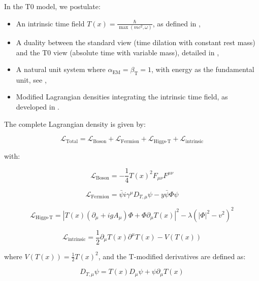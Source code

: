 \documentclass[12pt,a4paper]{article}
\newcommand{\Tfield}{T(x)}
\newcommand{\alphaEM}{\alpha_{\text{EM}}}
\newcommand{\betaT}{\beta_{\text{T}}}
\newcommand{\DhiggsT}{\Tfield (\partial_\mu + ig A_\mu) \Phi + \Phi \partial_\mu \Tfield}
\newcommand{\DTmu}{D_{T,\mu}}
\newcommand{\calL}{\mathcal{L}}
\begin{document}
	In the T0 model, we postulate:
	\begin{itemize}
		\item An intrinsic time field $\Tfield = \frac{\hbar}{\max(mc^2, \omega)}$, as defined in \cite{pascher_zeit_2025_en},
		\item A duality between the standard view (time dilation with constant rest mass) and the T0 view (absolute time with variable mass), detailed in \cite{pascher_dualismus_2025_en},
		\item A natural unit system where $\alphaEM = \betaT = 1$, with energy as the fundamental unit, see \cite{pascher_alpha_2025_en},
		\item Modified Lagrangian densities integrating the intrinsic time field, as developed in \cite{pascher_lagrange_2025_en}.
	\end{itemize}
	
	The complete Lagrangian density is given by:
	
	\begin{equation}
		\calL_{\text{Total}} = \calL_{\text{Boson}} + \calL_{\text{Fermion}} + \calL_{\text{Higgs-T}} + \calL_{\text{intrinsic}}
	\end{equation}
	
	with:
	
	\begin{equation}
		\calL_{\text{Boson}} = -\frac{1}{4}\Tfield^2 F_{\mu\nu}F^{\mu\nu}
	\end{equation}
	
	\begin{equation}
		\calL_{\text{Fermion}} = \bar{\psi}i\gamma^{\mu}\DTmu\psi - y\bar{\psi}\Phi\psi
	\end{equation}
	
	\begin{equation}
		\calL_{\text{Higgs-T}} = |\DhiggsT|^2 - \lambda(|\Phi|^2 - v^2)^2
	\end{equation}
	
	\begin{equation}
		\calL_{\text{intrinsic}} = \frac{1}{2}\partial_{\mu}\Tfield\partial^{\mu}\Tfield - V(\Tfield)
	\end{equation}
	
	where $V(\Tfield) = \frac{1}{2}\Tfield^2$, and the T-modified derivatives are defined as:
	
	\begin{equation}
		\DTmu\psi = \Tfield D_{\mu}\psi + \psi\partial_{\mu}\Tfield
	\end{equation}
	
\end{document}
